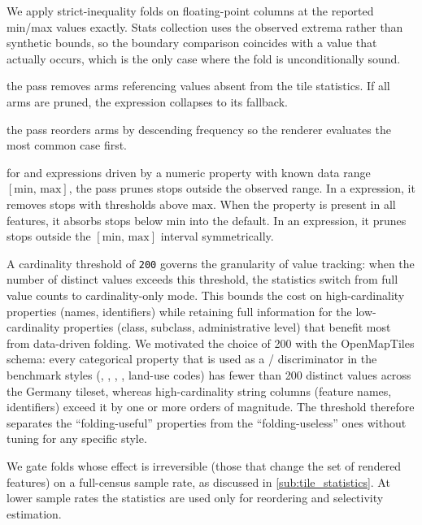 \begin{description}
    We apply strict-inequality folds on floating-point columns at the reported min/max values exactly.
Stats collection uses the observed extrema rather than synthetic bounds, so the boundary comparison coincides with a value that actually occurs, which is the only case where the fold is unconditionally sound.
    \item[\textbf{Match/in arm pruning}] the pass removes arms referencing values absent from the tile statistics.
If all arms are pruned, the expression collapses to its fallback.
    \item[\textbf{Match arm reordering}] the pass reorders arms by descending frequency so the renderer evaluates the most common case first.
    \item[\textbf{Data-ramp pruning}] for  and  expressions driven by a numeric property with known data range $[\mathrm{min},\, \mathrm{max}]$, the pass prunes stops outside the observed range.
    In a  expression, it removes stops with thresholds above $\mathrm{max}$.
When the property is present in all features, it absorbs stops below $\mathrm{min}$ into the default.
    In an  expression, it prunes stops outside the $[\mathrm{min},\, \mathrm{max}]$ interval symmetrically.
\end{description}

\noindent A cardinality threshold of \texttt{200} governs the granularity of value tracking: when the number of distinct values exceeds this threshold, the statistics switch from full value counts to cardinality-only mode.
This bounds the cost on high-cardinality properties (names, identifiers) while retaining full information for the low-cardinality properties (class, subclass, administrative level) that benefit most from data-driven folding.
We motivated the choice of 200 with the OpenMapTiles schema: every categorical property that is used as a /  discriminator in the benchmark styles (\texttt{}, \texttt{}, \texttt{}, \texttt{}, land-use codes) has fewer than 200 distinct values across the Germany tileset, whereas high-cardinality string columns (feature names, identifiers) exceed it by one or more orders of magnitude.
The threshold therefore separates the \enquote{folding-useful} properties from the \enquote{folding-useless} ones without tuning for any specific style.

We gate folds whose effect is irreversible (those that change the set of rendered features) on a full-census sample rate, as discussed in \cref{sub:tile_statistics}.
At lower sample rates the statistics are used only for reordering and selectivity estimation.

